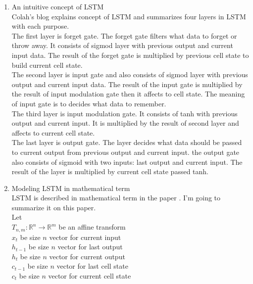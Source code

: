 \documentclass[12pt]{article}
\begin{document}
\begin{enumerate}
	\begin{enumerate}
	\item An intuitive concept of LSTM\\
		Colah's blog explains concept of LSTM and summarizes four layers in LSTM with each purpose.\\
		The first layer is forget gate. The forget gate filters what data to forget or throw away. It consists of sigmod layer with previous output and current input data. The result of the forget gate is multiplied by previous cell state to build current cell state.\\
		The second layer is input gate and also consists of sigmod layer with previous output and current input data. The result of the input gate is multiplied by the result of input modulation gate then it affects to cell state. The meaning of input gate is to decides what data to remember.\\
		The third layer is input modulation gate. It consists of tanh with previous output and current input. It is multiplied by the result of second layer and affects to current cell state.\\
		The last layer is output gate. The layer decides what data should be passed to current output from previous output and current input. the output gate also consists of sigmoid with two inputs: last output and current input. The result of the layer is multiplied by current cell state passed tanh.
	
	\item Modeling LSTM in mathematical term\\
		LSTM is described in mathematical term in the paper \cite{zaremba2014recurrent}. I'm going to summarize it on this paper.\\
	Let\\
	$T_{n,m}: \mathbb{R}^n \rightarrow \mathbb{R}^m$ be an affine transform\\
	$x_t$ be size $n$ vector for current input\\
	$h_{t-1}$ be size $n$ vector for last output \\
	$h_{t}$ be size $n$ vector for current output \\
	$c_{t-1}$ be size $n$ vector for last cell state \\
	$c_{t}$ be size $n$ vector for current cell state \\


\end{enumerate}
\end{enumerate}
\end{document}
